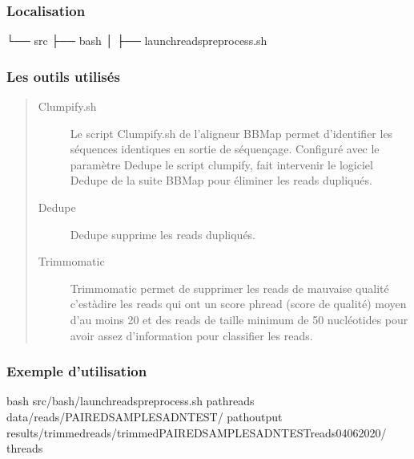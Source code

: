 \documentclass[letterpaper,10pt,french]{sphinxmanual}
\begin{document}
\subsubsection{Localisation}
\label{\detokenize{tutorial:localisation}}
\begin{sphinxVerbatim}[commandchars=\\\{\}]
└── src
 ├── bash
 │   ├── launch\PYGZus{}reads\PYGZus{}preprocess.sh
\end{sphinxVerbatim}


\subsubsection{Les outils utilisés}
\label{\detokenize{tutorial:les-outils-utilises}}\begin{quote}\begin{description}
\item[{Clumpify.sh}] \leavevmode
Le script Clumpify.sh de l’aligneur BBMap permet d’identifier les séquences identiques en sortie de séquençage. Configuré avec le paramètre Dedupe le script clumpify, fait intervenir le logiciel Dedupe de la suite BBMap pour éliminer les reads dupliqués.

\item[{Dedupe}] \leavevmode
Dedupe supprime les reads dupliqués.

\item[{Trimmomatic}] \leavevmode
Trimmomatic permet de supprimer les reads de mauvaise qualité c’est\sphinxhyphen{}à\sphinxhyphen{}dire les reads qui ont un score phread (score de qualité) moyen d’au moins 20 et des reads de taille minimum de 50 nucléotides pour avoir assez d’information pour classifier les reads.

\end{description}\end{quote}


\subsubsection{Exemple d’utilisation}
\label{\detokenize{tutorial:exemple-d-utilisation}}
\begin{sphinxVerbatim}[commandchars=\\\{\}]
bash src/bash/launch\PYGZus{}reads\PYGZus{}preprocess.sh 
             \PYGZhy{}path\PYGZus{}reads data/reads/PAIRED\PYGZus{}SAMPLES\PYGZus{}ADN\PYGZus{}TEST/ 
             \PYGZhy{}path\PYGZus{}output results/trimmed\PYGZus{}reads/trimmed\PYGZus{}PAIRED\PYGZus{}SAMPLES\PYGZus{}ADN\PYGZus{}TEST\PYGZus{}reads\PYGZus{}04\PYGZus{}06\PYGZus{}2020/ 
             \PYGZhy{}threads 
\end{sphinxVerbatim}
\end{document}
